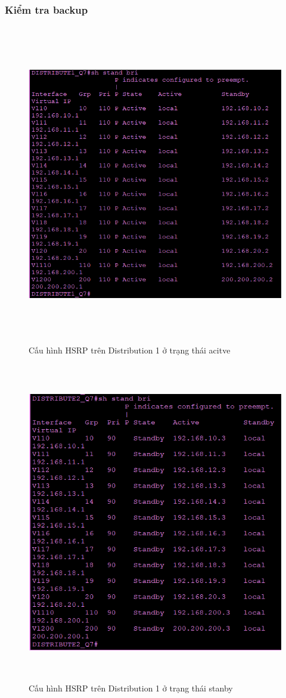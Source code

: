 \documentclass[a4paper, 12pt]{article}
\begin{document}
\subsubsection{Kiểm tra backup}
\begin{figure}[H]
    \centering
    \includegraphics[width=16cm, height=14cm]{img/4.13.1j.png}
    \caption{Cấu hình HSRP trên Distribution 1 ở trạng thái acitve}
    \label{hinh4131j}
\end{figure}

\begin{figure}[H]
    \centering
    \includegraphics[width=16cm, height=14cm]{img/4.13.2a.png}
    \caption{Cấu hình HSRP trên Distribution 1 ở trạng thái stanby}
    \label{hinh4132a}
\end{figure}
\end{document}
